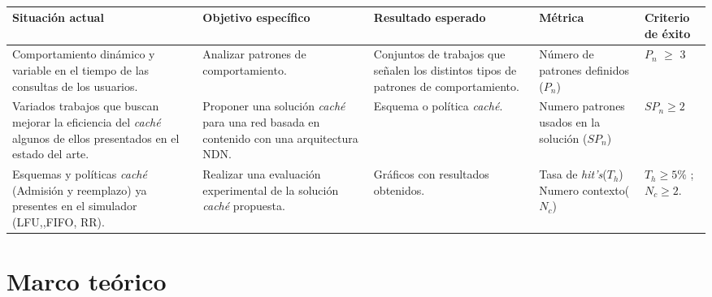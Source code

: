 \documentclass[12pt]{ociamthesis}  %
\begin{document}
\begin{table}[H]
	
	\begin{tabular}{|p{3cm}|p{3cm}|p{3cm}|p{3cm}|p{2cm}|}
		\hline
		\textbf{Situación actual} & \textbf{Objetivo específico} & \textbf{Resultado esperado} & \textbf{Métrica} & \textbf{Criterio de éxito}\\ \hline
		Comportamiento dinámico y variable en el tiempo de las consultas de los usuarios. & Analizar patrones de comportamiento. & Conjuntos de trabajos que señalen los distintos tipos de patrones de comportamiento. & Número de patrones definidos ($P_n$) & $P_n$ $\geq$ 3\\ \hline
		
		Variados trabajos que buscan mejorar la eficiencia del \textit{caché} algunos de ellos presentados en el estado del arte. & Proponer una solución \textit{caché} para una red basada en contenido con una arquitectura NDN. & Esquema o política \textit{caché}. & Numero patrones usados en la solución ($SP_n$) & $SP_n \geq 2$\\ \hline
		
		Esquemas y políticas \textit{caché} (Admisión y reemplazo) ya presentes en el simulador (LFU,,FIFO, RR). & Realizar una evaluación experimental de la solución \textit{caché} propuesta. & Gráficos con resultados obtenidos. & Tasa de \textit{hit's}($T_h$) Numero contexto($N_c$) &  $T_h \geq 5\%$ ; $N_c \geq 2$. \\ \hline
		
	\end{tabular}
	\caption{}
	\label{Tabla_alineamiento}
\end{table}

\chapter{Marco teórico}
\end{document}
